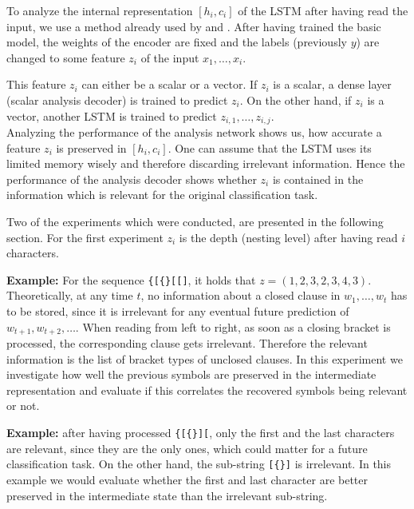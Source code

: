 \documentclass[11pt,a4paper]{article}
\begin{document}
To analyze the internal representation $[h_i, c_i]$ of the LSTM after having read the input, we use a method already used by \citeauthor{shi2016does}  and \citeauthor{belinkov2017neural} . After having trained the basic model, the weights of the encoder are fixed and the labels (previously $y$) are changed to some feature $z_i$ of the input $x_1,\ldots, x_i$.

This feature $z_i$ can either be a scalar or a vector. If $z_i$ is a scalar, a dense layer (scalar analysis decoder) is trained to predict $z_i$. On the other hand, if $z_i$ is a vector, another LSTM is trained to predict $z_{i,1},\ldots,z_{i,j}$.\\

Analyzing the performance of the analysis network shows us, how accurate a feature $z_i$ is preserved in $[h_i, c_i]$. One can assume that the LSTM uses its limited memory wisely and therefore discarding irrelevant information. Hence the performance of the analysis decoder shows whether $z_i$ is contained in the information which is relevant for the original classification task.

Two of the experiments which were conducted, are presented in the following section. For the first experiment $z_i$ is the depth (nesting level) after having read $i$ characters.

\textbf{Example:} For the sequence \verb|{[{}[[]|, it holds that $z = (1,2,3,2,3,4,3)$.\\

Theoretically, at any time $t$, no information about a closed clause in $w_1,\ldots, w_t$ has to be stored, since it is irrelevant for any eventual future prediction of $w_{t+1}, w_{t+2},\ldots$. 
When reading from left to right, as soon as a closing bracket is processed, the corresponding clause gets irrelevant. Therefore the relevant information is the list of bracket types of unclosed clauses. In this experiment we investigate how well the previous symbols are preserved in the intermediate representation and evaluate if this correlates the recovered symbols being relevant or not.

\textbf{Example:} after having processed \verb|{[{}][|, only the first and the last characters are relevant, since they are the only ones, which could matter for a future classification task. On the other hand, the sub-string \verb|[{}]| is irrelevant. In this example we would evaluate whether the first and last character are better preserved in the intermediate state than the irrelevant sub-string.
\end{document}
